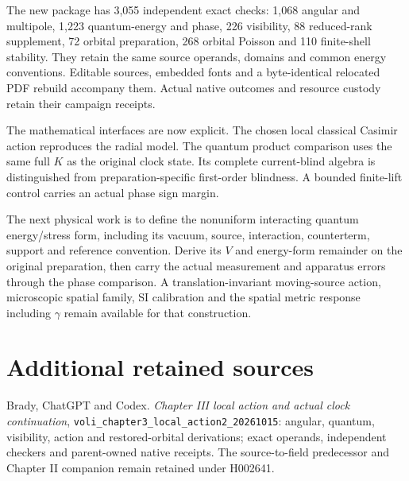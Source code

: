 \documentclass[10pt,twocolumn,letterpaper]{article}
\begin{document}
The new package has 3,055 independent exact checks: 1,068 angular and multipole, 1,223 quantum-energy and phase, 226 visibility, 88 reduced-rank supplement, 72 orbital preparation, 268 orbital Poisson and 110 finite-shell stability. They retain the same source operands, domains and common energy conventions. Editable sources, embedded fonts and a byte-identical relocated PDF rebuild accompany them. Actual native outcomes and resource custody retain their campaign receipts.

The mathematical interfaces are now explicit. The chosen local classical Casimir action reproduces the radial model. The quantum product comparison uses the same full $K$ as the original clock state. Its complete current-blind algebra is distinguished from preparation-specific first-order blindness. A bounded finite-lift control carries an actual phase sign margin.

The next physical work is to define the nonuniform interacting quantum energy/stress form, including its vacuum, source, interaction, counterterm, support and reference convention. Derive its $V$ and energy-form remainder on the original preparation, then carry the actual measurement and apparatus errors through the phase comparison. A translation-invariant moving-source action, microscopic spatial family, SI calibration and the spatial metric response including $\gamma$ remain available for that construction.

\section*{Additional retained sources}
{\footnotesize\raggedright
\noindent[8] Brady, ChatGPT and Codex. \emph{Chapter III local action and actual clock continuation}, \nolinkurl{voli_chapter3_local_action2_20261015}: angular, quantum, visibility, action and restored-orbital derivations; exact operands, independent checkers and parent-owned native receipts. The source-to-field predecessor and Chapter II companion remain retained under H002641.

\par}
\end{document}
